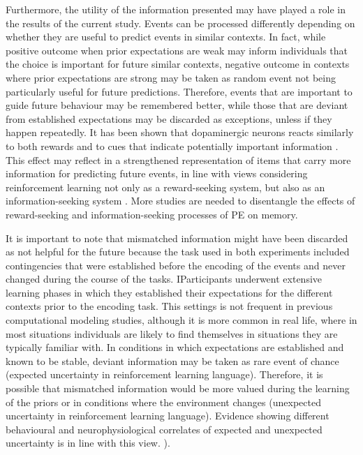 \documentclass[a4paper,12pt]{article}
\begin{document}
 Furthermore, the utility of the information presented may have played a role in the results of the current study. Events can be processed differently depending on whether they are useful to predict events in similar contexts. In fact, while positive outcome when prior expectations are weak may inform individuals that the choice is important for future similar contexts, negative outcome in contexts where prior expectations are strong may be taken as random event not being particularly useful for future predictions. Therefore, events that are important to guide future behaviour may be remembered better, while those that are deviant from established expectations may be discarded as exceptions, unless if they happen repeatedly. It has been shown that dopaminergic neurons reacts similarly to both rewards and to cues that indicate potentially important information \cite{ESBromberg-Martin2011}. This effect may reflect in a strengthened representation of items that carry more information for predicting future events, in line with views considering reinforcement learning not only as a reward-seeking system, but also as an information-seeking system \cite{ESBromberg-Martin2011, Niv2011}. More studies are needed to disentangle the effects of reward-seeking and information-seeking processes of PE on memory. \par
 It is important to note that mismatched information might have been discarded as not helpful for the future because the task used in both experiments included contingencies that were established before the encoding of the events and never changed during the course of the tasks.  IParticipants underwent extensive learning phases in which they established their expectations for the different contexts prior to the encoding task. This settings is not frequent in previous computational modeling studies, although it is more common in real life, where in most situations individuals are likely to find themselves in situations they are typically familiar with. In conditions in which expectations are established and known to be stable, deviant information may be taken as rare event of chance (expected uncertainty in reinforcement learning language). Therefore, it is possible that mismatched information would be more valued during the learning of the priors or in conditions where the environment changes (unexpected uncertainty in reinforcement learning language). Evidence showing different behavioural and neurophysiological correlates of expected and unexpected uncertainty is in line with this view. \cite{Yu2005}). 
 \par
\end{document}
